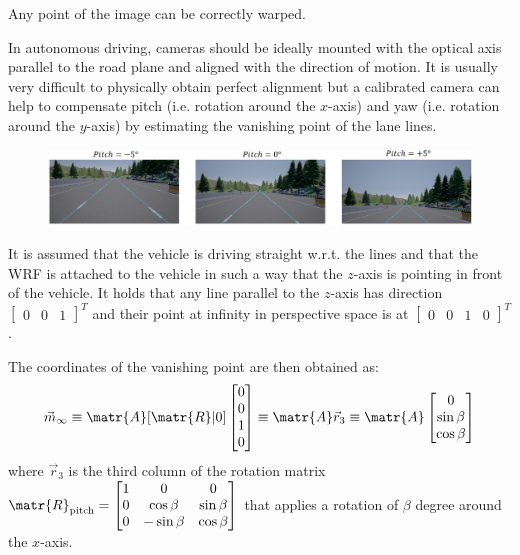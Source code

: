 \begin{descriptionlist}
        \begin{remark}
            Any point of the image can be correctly warped.
        \end{remark}

        \begin{example}
            In autonomous driving, cameras should be ideally mounted with the optical axis parallel to the road plane and aligned with the direction of motion.
            It is usually very difficult to physically obtain perfect alignment 
            but a calibrated camera can help to compensate pitch (i.e. rotation around the $x$-axis)
            and yaw (i.e. rotation around the $y$-axis) by estimating the vanishing point of the lane lines.

            \begin{figure}[H]
                \centering
                \includegraphics[width=0.85\linewidth]{./img/pitch_yaw_compensation.png}
            \end{figure}

            It is assumed that the vehicle is driving straight w.r.t. the lines and 
            that the WRF is attached to the vehicle in such a way that the $z$-axis is pointing in front of the vehicle.
            It holds that any line parallel to the $z$-axis has direction $\begin{bmatrix} 0 & 0 & 1 \end{bmatrix}^T$
            and their point at infinity in perspective space is at $\begin{bmatrix} 0 & 0 & 1 & 0 \end{bmatrix}^T$.

            The coordinates of the vanishing point are then obtained as:
            \[ 
                \vec{m}_\infty \equiv \matr{A}[\matr{R} | 0] \begin{bmatrix} 0 \\ 0 \\ 1 \\ 0 \end{bmatrix} 
                    \equiv \matr{A}\vec{r}_3 
                    \equiv \matr{A} \begin{bmatrix} 0 \\ \sin\beta \\ \cos\beta \end{bmatrix}
            \]
            where $\vec{r}_3$ is the third column of the rotation matrix $\matr{R}_\text{pitch} = \begin{bmatrix}
                1 & 0 & 0 \\ 0 & \cos\beta & \sin\beta \\ 0 & -\sin\beta & \cos\beta
            \end{bmatrix}$ that applies a rotation of $\beta$ degree around the $x$-axis.


\end{example}
\end{descriptionlist}
